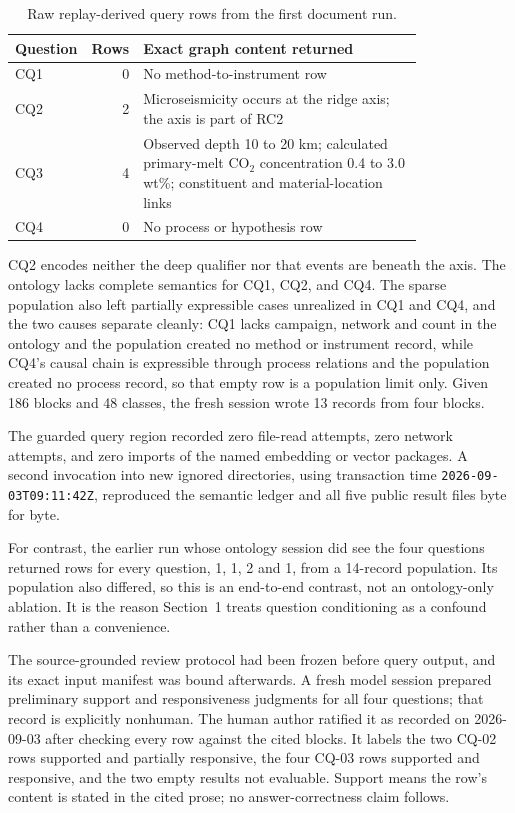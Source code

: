 \documentclass[10pt]{article}
\newcommand{\code}[1]{\texttt{#1}}
\begin{document}
\begin{table}[h!]
\centering
\caption{Raw replay-derived query rows from the first document run.}
\label{tab:query}
\small
\begin{tabular}{@{}p{0.09\linewidth}r p{0.72\linewidth}@{}}
\toprule
Question & Rows & Exact graph content returned \\
\midrule
CQ1 & 0 & No method-to-instrument row \\
CQ2 & 2 & Microseismicity occurs at the ridge axis; the axis is part of RC2 \\
CQ3 & 4 & Observed depth 10 to 20 km; calculated primary-melt CO$_2$ concentration 0.4 to 3.0 wt\%; constituent and material-location links \\
CQ4 & 0 & No process or hypothesis row \\
\bottomrule
\end{tabular}
\end{table}

CQ2 encodes neither the deep qualifier nor that events are beneath the axis. The ontology lacks complete semantics for CQ1, CQ2, and CQ4. The sparse population also left partially expressible cases unrealized in CQ1 and CQ4, and the two causes separate cleanly: CQ1 lacks campaign, network and count in the ontology and the population created no method or instrument record, while CQ4's causal chain is expressible through process relations and the population created no process record, so that empty row is a population limit only. Given 186 blocks and 48 classes, the fresh session wrote 13 records from four blocks.

The guarded query region recorded zero file-read attempts, zero network attempts, and zero imports of the named embedding or vector packages. A second invocation into new ignored directories, using transaction time \code{2026-09-03T09:11:42Z}, reproduced the semantic ledger and all five public result files byte for byte.

For contrast, the earlier run whose ontology session did see the four questions returned rows for every question, 1, 1, 2 and 1, from a 14-record population. Its population also differed, so this is an end-to-end contrast, not an ontology-only ablation. It is the reason Section~1 treats question conditioning as a confound rather than a convenience.

The source-grounded review protocol had been frozen before query output, and its exact input manifest was bound afterwards. A fresh model session prepared preliminary support and responsiveness judgments for all four questions; that record is explicitly nonhuman. The human author ratified it as recorded on 2026-09-03 after checking every row against the cited blocks. It labels the two CQ-02 rows supported and partially responsive, the four CQ-03 rows supported and responsive, and the two empty results not evaluable. Support means the row's content is stated in the cited prose; no answer-correctness claim follows.
\end{document}
